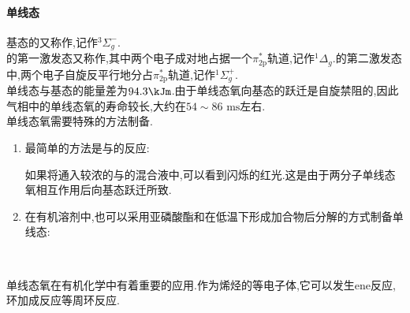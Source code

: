 \documentclass{ctexart}
\begin{document}
\paragraph{单线态}
基态的又称作,记作$^3\Sigma_g^-$.\\
\indent {}的第一激发态又称作,其中两个电子成对地占据一个$\pi_{2\text{p}}^\ast$轨道,记作$^1\Delta_g$.的第二激发态中,两个电子自旋反平行地分占$\pi_{2\text{p}}^\ast$轨道,记作$^1\Sigma_g^+$.\\
\indent 单线态与基态的能量差为$94.3\kJm$.由于单线态氧向基态的跃迁是自旋禁阻的,因此气相中的单线态氧的寿命较长,大约在$54\sim86\text{ ms}$左右.\\
\indent 单线态氧需要特殊的方法制备.
\begin{enumerate}[label=\tbf{\arabic*},topsep=0pt,parsep=0pt,itemsep=0pt,partopsep=0pt]
    \item 最简单的方法是与的反应:
        \begin{center}
        \end{center}
        如果将通入较浓的与的混合液中,可以看到闪烁的红光.这是由于两分子单线态氧相互作用后向基态跃迁所致.
    \item 在有机溶剂中,也可以采用亚磷酸酯和在低温下形成加合物后分解的方式制备单线态:
        \begin{center}
            \\
        \end{center}
\end{enumerate}

\indent 单线态氧在有机化学中有着重要的应用.作为烯烃的等电子体,它可以发生ene反应,环加成反应等周环反应.
\end{document}
